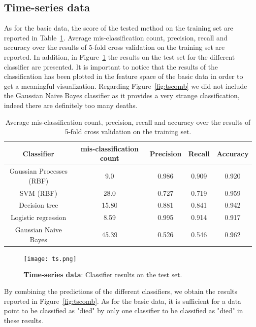 \documentclass[a4paper,11pt]{article}
\begin{document}
\subsection{Time-series data}\label{sec:res_ts_data}
As for the basic data, the score of the tested method on the training set are reported in Table~\ref{tab:tsscores}. Average mis-classification count, precision, recall and accuracy over the results of 5-fold cross validation on the training set are reported. In addition, in Figure~\ref{fig:tstest} the results on the test set for the different classifier are presented. It is important to notice that the results of the classification has been plotted in the feature space of the basic data in order to get a meaningful visualization. Regarding Figure~\ref{fig:tscomb} we did not include the Gaussian Naive Bayes classifier as it provides a very strange classification, indeed there are definitely too many deaths.

\begin{table}[H]
    \centering
    \begin{tabular}{|c|c|c|c|c|}
    \hline
        Classifier & mis-classification count & Precision & Recall & Accuracy \\
    \hline
        Gaussian Processes (RBF)& 9.0   & 0.986 & 0.909 & 0.920\\
        SVM (RBF)               & 28.0  & 0.727 & 0.719 & 0.959\\
        Decision tree           & 15.80 & 0.881 & 0.841 & 0.942\\
        Logistic regression     & 8.59  & 0.995 & 0.914 & 0.917\\
        Gaussian Naive Bayes    & 45.39 & 0.526 & 0.546 & 0.962\\
    \hline
    \end{tabular}
    \caption{Average mis-classification count, precision, recall and accuracy over the results of 5-fold cross validation on the training set.}
    \label{tab:tsscores}
\end{table}

\begin{figure}[H]
    \centering
    \texttt{[image: ts.png]}
    \caption{\textbf{Time-series data}: Classifier results on the test set.}
    \label{fig:tstest}
\end{figure}

By combining the predictions of the different classifiers, we obtain the results reported in Figure~\ref{fig:tscomb}. As for the basic data, it is sufficient for a data point to be classified as "died" by only one classifier to be classified as "died" in these results.
\end{document}
